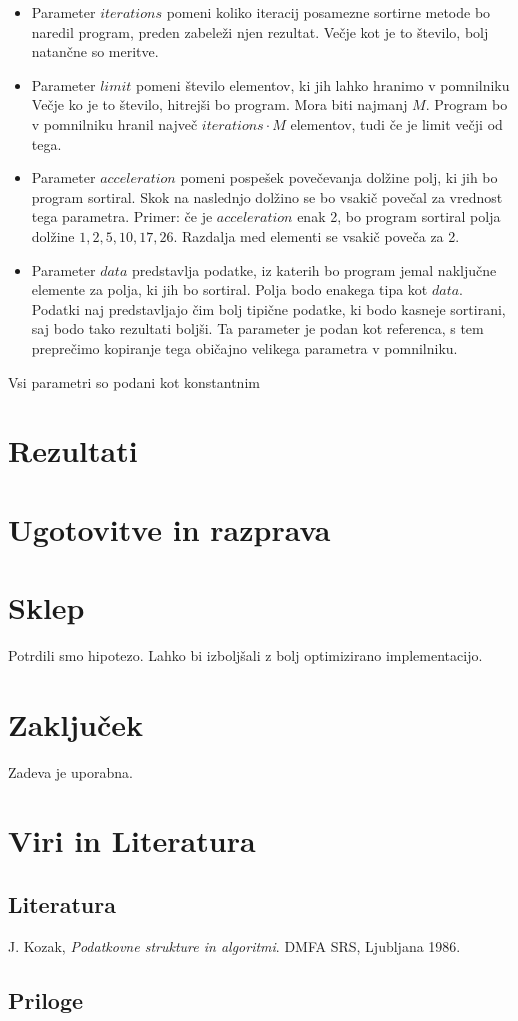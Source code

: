 \documentclass[a4paper,oneside]{article}
\begin{document}
\begin{itemize}
  \item Parameter $iterations$ pomeni koliko iteracij posamezne sortirne metode bo naredil
    program, preden zabeleži njen rezultat. Večje kot je to število, bolj natančne so
    meritve.
  \item Parameter $limit$ pomeni število elementov, ki jih lahko hranimo v pomnilniku
    Večje ko je to število, hitrejši bo program. Mora biti najmanj $M$. Program bo v
    pomnilniku hranil največ $iterations \cdot M$ elementov, tudi če je limit večji od
    tega.
  \item Parameter $acceleration$ pomeni pospešek povečevanja dolžine polj, ki jih bo
    program sortiral. Skok na naslednjo dolžino se bo vsakič povečal za vrednost tega
    parametra. Primer: če je $acceleration$ enak 2, bo program sortiral polja dolžine
    $1, 2, 5, 10, 17, 26$. Razdalja med elementi se vsakič poveča za 2.
  \item Parameter $data$ predstavlja podatke, iz katerih bo program jemal naključne
    elemente za polja, ki jih bo sortiral. Polja bodo enakega tipa kot $data$. Podatki naj
    predstavljajo čim bolj tipične podatke, ki bodo kasneje sortirani, saj bodo tako
    rezultati boljši. Ta parameter je podan kot referenca, s tem preprečimo kopiranje
    tega običajno velikega parametra v pomnilniku.
\end{itemize}
Vsi parametri so podani kot konstantnim 

\section{Rezultati}
\section{Ugotovitve in razprava}
\section{Sklep}
Potrdili smo hipotezo. Lahko bi izboljšali z bolj optimizirano implementacijo.
\section{Zaključek}
Zadeva je uporabna.
\section{Viri in Literatura}
\subsection{Literatura}
\vspace{-1cm}
\begin{thebibliography}{99}
   {J. Kozak, \emph{Podatkovne strukture in algoritmi}. DMFA SRS, Ljubljana 1986. }
\end{thebibliography}
\subsection{Priloge}
\end{document}
